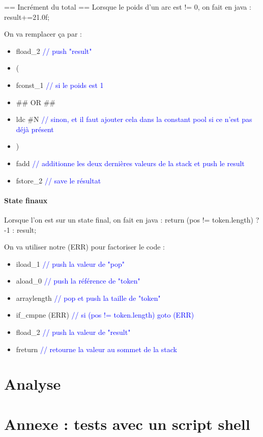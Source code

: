 == Incrément du total ==
Lorsque le poids d'un arc est != 0, on fait en java : result+=21.0f;

On va remplacer ça par :
\begin{itemize}
    \item[] fload\_2  \textcolor{blue}{// push "result"}
    \item[] (
    \item[] fconst\_1 \textcolor{blue}{// si le poids est 1}
    \item[] \#\# OR \#\#
    \item[] ldc \#N  \textcolor{blue}{// sinon, et il faut ajouter cela dans la constant pool si ce n'est pas déjà présent}
    \item[] )
    \item[] fadd  \textcolor{blue}{// additionne les deux dernières valeurs de la stack et push le result}
    \item[] fstore\_2 \textcolor{blue}{// save le résultat}
\end{itemize}

\paragraph{State finaux}
Lorsque l'on est sur un state final, on fait en java : return (pos != token.length) ? -1 : result;

On va utiliser notre (ERR) pour factoriser le code :
\begin{itemize}
    \item iload\_1  \textcolor{blue}{// push la valeur de "pop"}
    \item aload\_0  \textcolor{blue}{// push la référence de "token"}
    \item arraylength  \textcolor{blue}{// pop et push la taille de "token"}
    \item if\_cmpne (ERR) \textcolor{blue}{// si (pos != token.length) goto (ERR)}
    \item fload\_2  \textcolor{blue}{// push la valeur de "result"}
        \item freturn \textcolor{blue}{// retourne la valeur au sommet de la stack}
    \end{itemize}

\newpage
\section{Analyse}

\newpage
\appendix
\section{Annexe : tests avec un script shell}
\label{sec:annexe:shell}


